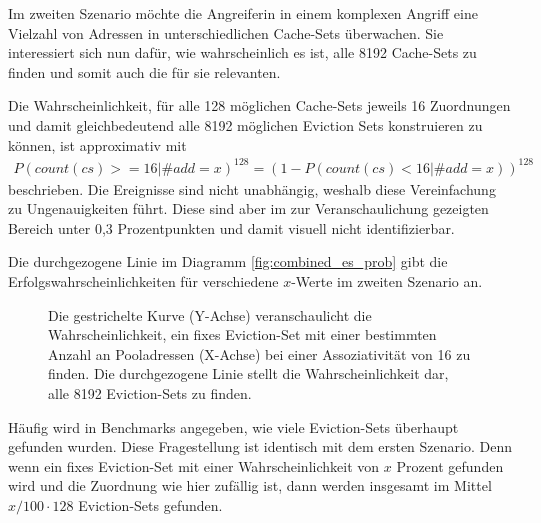
Im zweiten Szenario möchte die Angreiferin in einem komplexen Angriff eine Vielzahl von Adressen in unterschiedlichen Cache-Sets überwachen. 
Sie interessiert sich nun dafür, wie wahrscheinlich es ist, alle 8192 Cache-Sets zu finden und somit auch die für sie relevanten. 

Die Wahrscheinlichkeit, für alle 128 möglichen Cache-Sets jeweils 16 Zuordnungen und damit gleichbedeutend alle 8192 möglichen Eviction Sets konstruieren zu können, ist approximativ mit
\begin{align*}
P(count(cs)>=16|\#add = x)^{128} = (1-P(count(cs)<16|\#add = x))^{128}
\end{align*}
beschrieben.
Die Ereignisse sind nicht unabhängig, weshalb diese Vereinfachung zu Ungenauigkeiten führt.
Diese sind aber im zur Veranschaulichung gezeigten Bereich unter 0,3 Prozentpunkten und damit visuell nicht identifizierbar.

Die durchgezogene Linie im Diagramm \ref{fig:combined_es_prob} gibt die Erfolgswahrscheinlichkeiten für verschiedene $x$-Werte im zweiten Szenario an. 


\label{fig:combined_es_prob}
\begin{figure}[h]
\centering
\begin{scaletikzpicturetowidth}{\textwidth}

\end{scaletikzpicturetowidth}
\caption{Die gestrichelte Kurve (Y-Achse) veranschaulicht die Wahrscheinlichkeit, ein fixes Eviction-Set mit einer bestimmten Anzahl an Pooladressen (X-Achse) bei einer Assoziativität von 16 zu finden. Die durchgezogene Linie stellt die Wahrscheinlichkeit dar, alle 8192 Eviction-Sets zu finden.}
\end{figure}

Häufig wird in Benchmarks angegeben, wie viele Eviction-Sets überhaupt gefunden wurden.
Diese Fragestellung ist identisch mit dem ersten Szenario.
Denn wenn ein fixes Eviction-Set mit einer Wahrscheinlichkeit von $x$ Prozent gefunden wird und die Zuordnung wie hier zufällig ist, dann werden insgesamt im Mittel $x/100 \cdot 128$ Eviction-Sets gefunden.

